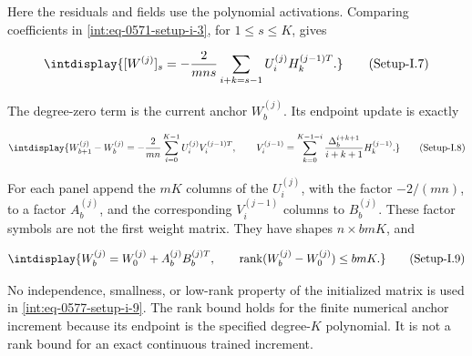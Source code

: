 
Here the residuals and fields use the polynomial activations. Comparing coefficients in \hyperref[int:eq-setup-i-3]{\eqref{int:eq-0571-setup-i-3}}, for \(1\le s\le K\), gives


\label{int:eq-setup-i-7}
\begingroup\renewcommand{\theHequation}{intdisplay.1089}
\begin{equation}
\intdisplay{
[W^{(j)}]_s=-\frac2{mns}
\sum_{i+k=s-1}U_i^{(j)}H_k^{(j-1)T}.
}
\tag{Setup-I.7}
\label{int:eq-0575-setup-i-7}
\end{equation}
\endgroup


The degree-zero term is the current anchor \(W_b^{(j)}\). Its endpoint update is exactly


\label{int:eq-setup-i-8}
\begingroup\renewcommand{\theHequation}{intdisplay.1090}
\begin{equation}
\intdisplay{
W_{b+1}^{(j)}-W_b^{(j)}
=-\frac2{mn}\sum_{i=0}^{K-1}U_i^{(j)}V_i^{(j-1)T},\qquad
V_i^{(j-1)}=\sum_{k=0}^{K-1-i}
\frac{\Delta_b^{i+k+1}}{i+k+1}H_k^{(j-1)}.
}
\tag{Setup-I.8}
\label{int:eq-0576-setup-i-8}
\end{equation}
\endgroup


For each panel append the \(mK\) columns of the \(U_i^{(j)}\), with the factor \(-2/(mn)\), to a factor \(A_b^{(j)}\), and the corresponding \(V_i^{(j-1)}\) columns to \(B_b^{(j)}\). These factor symbols are not the first weight matrix. They have shapes \(n\times bmK\), and


\label{int:eq-setup-i-9}
\begingroup\renewcommand{\theHequation}{intdisplay.1091}
\begin{equation}
\intdisplay{
W_b^{(j)}=W_0^{(j)}+A_b^{(j)}B_b^{(j)T},\qquad
\operatorname{rank}(W_b^{(j)}-W_0^{(j)})\le bmK.
}
\tag{Setup-I.9}
\label{int:eq-0577-setup-i-9}
\end{equation}
\endgroup


No independence, smallness, or low-rank property of the initialized matrix is used in \hyperref[int:eq-setup-i-9]{\eqref{int:eq-0577-setup-i-9}}. The rank bound holds for the finite numerical anchor increment because its endpoint is the specified degree-\(K\) polynomial. It is not a rank bound for an exact continuous trained increment.



